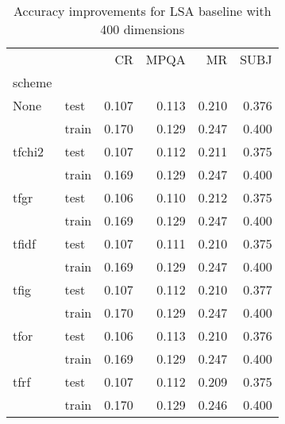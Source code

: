 \begin{table}[h]
\begin{center}

\begin{tabular}{llrrrr}
\toprule
{} &      &  CR &  MPQA &  MR &  SUBJ \\
scheme &  &            &              &            &              \\
\midrule
None & test &      0.107 &        0.113 &      0.210 &        0.376 \\
{} & train &      0.170 &        0.129 &      0.247 &        0.400 \\
tfchi2 & test &      0.107 &        0.112 &      0.211 &        0.375 \\
{} & train &      0.169 &        0.129 &      0.247 &        0.400 \\
tfgr & test &      0.106 &        0.110 &      0.212 &        0.375 \\
{} & train &      0.169 &        0.129 &      0.247 &        0.400 \\
tfidf & test &      0.107 &        0.111 &      0.210 &        0.375 \\
{} & train &      0.169 &        0.129 &      0.247 &        0.400 \\
tfig & test &      0.107 &        0.112 &      0.210 &        0.377 \\
{} & train &      0.170 &        0.129 &      0.247 &        0.400 \\
tfor & test &      0.106 &        0.113 &      0.210 &        0.376 \\
{} & train &      0.169 &        0.129 &      0.247 &        0.400 \\
tfrf & test &      0.107 &        0.112 &      0.209 &        0.375 \\
{} & train &      0.170 &        0.129 &      0.246 &        0.400 \\
\bottomrule
\end{tabular}

\caption[Accuracy improvements for LSA baseline with 400 dimensions]{Accuracy improvements for LSA baseline with 400 dimensions}
\label{tab:lsa:resuts:400}
\end{center}
\end{table}


